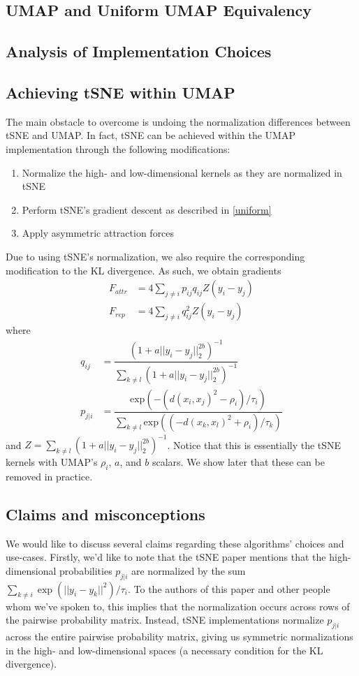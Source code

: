 \documentclass{article}
\theoremstyle{definition}
\begin{document}
\subsection{UMAP and Uniform UMAP Equivalency}

\subsection{Analysis of Implementation Choices}

\subsection{Achieving tSNE within UMAP}
The main obstacle to overcome is undoing the normalization
differences between tSNE and UMAP. In fact, tSNE can be achieved within the UMAP implementation through the following modifications:
\begin{enumerate}
    \item Normalize the high- and low-dimensional kernels as they are normalized in tSNE
    \item Perform tSNE's gradient descent as described in \ref{uniform}
    \item Apply asymmetric attraction forces
\end{enumerate}
Due to using tSNE's normalization, we also require the corresponding modification to the KL divergence. As such, we obtain gradients
\begin{align*}
    F_{attr} &= 4 \sum_{j \neq i} p_{ij} q_{ij} Z (y_i - y_j) \\
   F_{rep} &= 4 \sum_{j \neq i} q_{ij}^2 Z (y_i - y_j)
\end{align*}
   where
\begin{align*}
   q_{ij} &= \dfrac{(1 + a ||y_i - y_j||_2^{2b})^{-1}}{\sum_{k \neq l} (1 + a ||y_i - y_j||_2^{2b})^{-1}} \\
    p_{j|i} &= \dfrac{\text{exp}( -(d(x_i, x_j)^2 - \rho_i) / \tau_i)}{\sum_{k \neq l} \text{exp}( (-d(x_k, x_l)^2 + \rho_i) / \tau_k)}
\end{align*}
   and $Z = \sum_{k \neq l} (1 + a ||y_i
   - y_j||_2^{2b})^{-1}$. Notice that this is essentially the tSNE kernels with UMAP's $\rho_i$, $a$, and $b$ scalars. We show later that these can be removed
   in practice.

\subsection{Claims and misconceptions}
We would like to discuss several claims regarding these algorithms' choices and use-cases. Firstly, we'd like to note that the tSNE paper mentions
that the high-dimensional probabilities $p_{j|i}$ are normalized by the sum $\sum_{k \neq i} \exp\left( ||y_i - y_k||^2 \right) / \tau_i$. To the authors of
this paper and other people whom we've spoken to, this implies that the normalization occurs across rows of the pairwise probability matrix. Instead, tSNE
implementations normalize $p_{j|i}$ across the entire pairwise probability matrix, giving us symmetric normalizations in the high- and low-dimensional spaces (a
necessary condition for the KL divergence).
\end{document}
